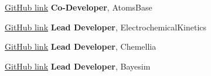     {\href{https://github.com/https://github.com/JuliaMolSim/AtomsBase.jl}{GitHub link}}
    {\textbf{Co-Developer}, AtomsBase}
    {}

\vspace{-4mm}
    {\href{https://github.com/BattModels/ElectrochemicalKinetics.jl}{GitHub link}}
    {\textbf{Lead Developer}, ElectrochemicalKinetics}
    {}

\vspace{-4mm}
    {\href{https://github.com/Chemellia}{GitHub link}}
    {\textbf{Lead Developer}, Chemellia}
    {}

\vspace{-4mm}
    {\href{https://github.com/PV-Lab/bayesim}{GitHub link}}
    {\textbf{Lead Developer}, Bayesim}
    {}
